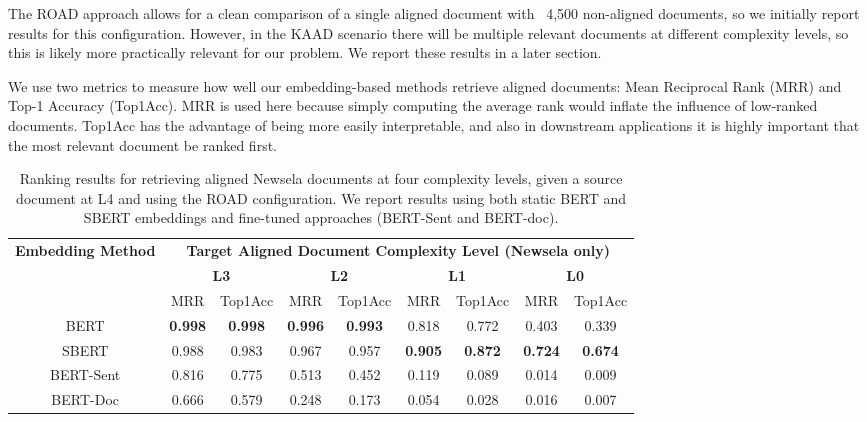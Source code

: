 \documentclass[thesis.tex]{subfiles}
\begin{document}
The ROAD approach allows for a clean comparison of a single aligned document with ~4,500 non-aligned documents, so we initially report results for this configuration. However, in the KAAD scenario there will be multiple relevant documents at different complexity levels, so this is likely more practically relevant for our problem. We report these results in a later section.

We use two metrics to measure how well our embedding-based methods retrieve aligned documents: Mean Reciprocal Rank (MRR) and Top-1 Accuracy (Top1Acc). MRR is used here because simply computing the average rank would inflate the influence of low-ranked documents. Top1Acc has the advantage of being more easily interpretable, and also in downstream applications it is highly important that the most relevant document be ranked first.

\begin{table}
\begin{center}
\small
\begin{tabular}{|c|cc|cc|cc|cc|}
\hline
\multirow{3}{2cm}{\centering \textbf{Embedding Method}} & \multicolumn{8}{|c|}{\textbf{Target Aligned Document Complexity Level (Newsela only)}} \\
& \multicolumn{2}{|c|}{\textbf{L3}} & \multicolumn{2}{|c|}{\textbf{L2}} & \multicolumn{2}{|c|}{\textbf{L1}} & \multicolumn{2}{|c|}{\textbf{L0}} \\
& MRR & Top1Acc & MRR & Top1Acc & MRR & Top1Acc & MRR & Top1Acc \\ \hline
BERT & \textbf{0.998} & 
\textbf{0.998} & \textbf{0.996} & \textbf{0.993} & 0.818 & 0.772 & 0.403 & 0.339 \\
SBERT & 0.988 & 0.983 & 0.967 & 0.957 & \textbf{0.905} & \textbf{0.872} & \textbf{0.724} & \textbf{0.674} \\ \hline
BERT-Sent & 0.816 & 0.775 & 0.513 & 0.452 & 0.119 & 0.089 & 0.014 & 0.009 \\
BERT-Doc & 0.666 & 0.579 & 0.248 & 0.173 & 0.054 & 0.028 & 0.016 & 0.007 \\ \hline
\end{tabular}
\end{center}
\caption{\label{table:ir_newsela} Ranking results for retrieving aligned Newsela documents at four complexity levels, given a source document at L4 and using the ROAD configuration. We report results using both static BERT and SBERT embeddings and fine-tuned approaches (BERT-Sent and BERT-doc).}
\end{table}
\end{document}
